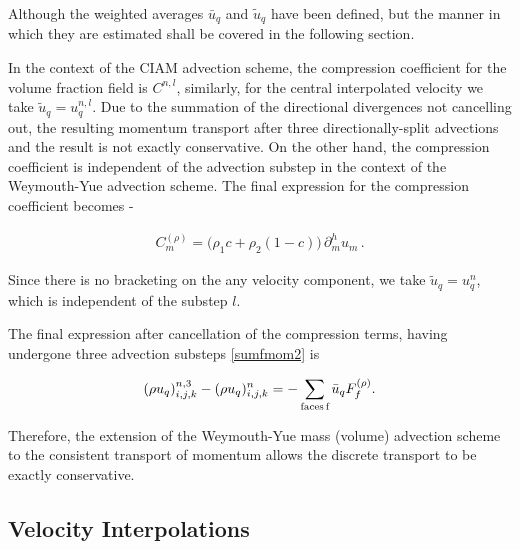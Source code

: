 Although the weighted averages $\bar u_q$ and $\tilde u_q$ have been defined,
but the manner in which they are estimated shall be covered in the following section. 

In the context of the CIAM advection scheme, the compression coefficient
for the volume fraction field is $C^{n,l}$, similarly, for the 
central interpolated velocity we take $\tilde u_q = u_q^{n,l}$. 
Due to the summation of the directional divergences not cancelling out,
the resulting momentum transport after three directionally-split advections
and the result is not exactly conservative. 
On the other hand, the compression coefficient is independent 
of the advection substep in the context of the Weymouth-Yue advection scheme. 
The final expression for the compression coefficient becomes - 


\begin{align}
C_m^{(\rho)} =  \Big( \rho_1 c + \rho_2 (1-c ) \Big) \,\partial_{m}^h u_m  \,.
\label{central2}
\end{align}


Since there is no bracketing on the any velocity component, 
we take $\tilde u_q = u_q^{n}$, which is independent of the substep $l$.



The final expression after cancellation of the compression terms,
having undergone three advection substeps \eqref{sumfmom2} is  

\begin{align}
	{(\rho u_{q})_{i,j,k}^{n,3} - (\rho u_{q})_{i,j,k}^{n}} =  - \sum_{\textrm{faces} \, \textrm{f}}  \bar u_{q}  F^{(\rho)}_{f} . 
\label{sumfmomtotfracstep}
\end{align}


Therefore, the extension of the Weymouth-Yue mass (volume) 
advection scheme to the consistent
transport of momentum allows the discrete 
transport to be exactly conservative. 


\subsection*{Velocity Interpolations}


